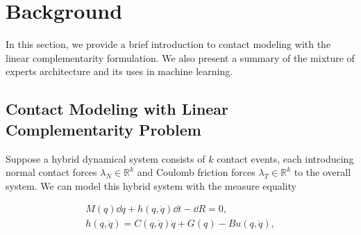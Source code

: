 
\section{Background}

In this section, we provide a brief introduction to contact modeling with the
linear complementarity formulation.
%
We also present a summary of the mixture of experts architecture and
its uses in machine learning.

\subsection{Contact Modeling with Linear Complementarity Problem}

Suppose a hybrid dynamical system consists of $k$ contact events, each
introducing normal contact forces $\lambda_N \in \mathbb{R}^{k}$ and Coulomb
friction forces $\lambda_T \in \mathbb{R}^{k}$ to the overall system.
%
We can model this hybrid system with the measure equality~\cite{glocker2005formulation}

\begin{equation}
  \begin{gathered}
    M(q) \dd \dot{q} + h(q, \dot{q})\dd t - \dd R  = 0, \\
    h(q, \dot{q}) = C(q, \dot{q})\dot{q} + G(q) - Bu(q, \dot{q}), 
  \end{gathered}
  \label{eq:hybrid_dynamics}
\end{equation}

